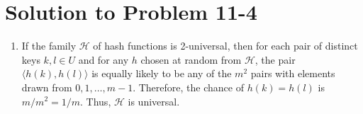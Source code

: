\documentclass[a4paper, fleqn]{article}
\begin{document}
\section*{Solution to Problem 11-4}
\begin{enumerate}
\renewcommand{\labelenumi}{\itshape \bfseries \alph{enumi}.}
\item  %
If the family $\mathcal{H}$ of hash functions is 2-universal, then for
each pair of distinct keys $k,l \in U$ and for any $h$ chosen at
random from $\mathcal{H}$, the pair $\langle h(k), h(l) \rangle$ is
equally likely to be any of the $m^2$ pairs with elements drawn from
${0, 1, \ldots, m-1}$. Therefore, the chance of $h(k) = h(l)$ is
$m/m^2 = 1/m$. Thus, $\mathcal{H}$ is universal.
\end{enumerate}
\end{document}
